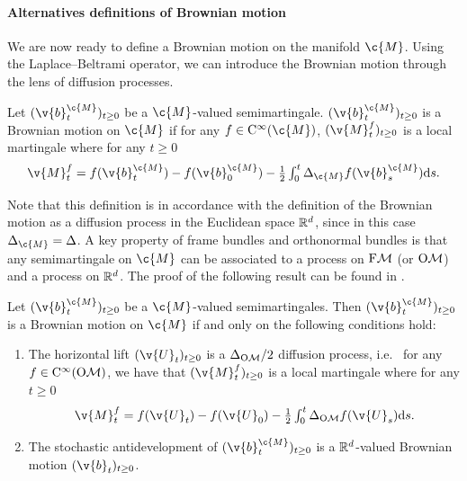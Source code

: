 \paragraph{Alternatives definitions of Brownian motion}

We are now ready to define a Brownian motion on the manifold $\c{M}$.
Using the Laplace--Beltrami operator, we can introduce the Brownian motion through the lens of diffusion processes.

\begin{definition}
	Let $(\v{b}_t^\c{M})_{t \geq 0}$ be a $\c{M}$-valued semimartingale.
	$(\v{b}_t^\c{M})_{t \geq 0}$ is a Brownian motion on $\c{M}$ if for any
	$f \in \mathrm{C}^\infty(\c{M})$, $(\v{M}_t^f)_{t \geq 0}$ is a local martingale where
	for any $t \geq 0$
	\begin{equation}
		\textstyle{\v{M}_t^f = f(\v{b}_t^\c{M}) - f(\v{b}_0^\c{M}) - \tfrac{1}{2}\int_0^t \Delta_{\c{M}}f(\v{b}_s^\c{M}) \mathrm{d} s  .}
	\end{equation}
\end{definition}

Note that this definition is in accordance with the definition of the Brownian motion as a diffusion process in the Euclidean space $\mathbb{R}^d$, since in this case $\Delta_{\c{M}} = \Delta$.
A key property of frame bundles and orthonormal bundles is that any semimartingale on $\c{M}$ can be associated to a process on $\mathrm{F}\mathcal{M}$ (or $\mathrm{O}\mathcal{M}$) and a process on $\mathbb{R}^d$.
The proof of the following result can be found in \textcite[Propositions 3.2.1 and 3.2.2]{hsu2002stochastic}.

\begin{proposition}
	\label{prop:intrinsic_brownian}
	Let $(\v{b}_t^\c{M})_{t \geq 0}$ be a $\c{M}$-valued semimartingales.
	Then $(\v{b}_t^\c{M})_{t \geq 0}$ is a Brownian motion on $\c{M}$ if and only on the following conditions hold: \begin{enumerate}[label=\alph*)] \item The horizontal lift $(\v{U}_t)_{t \geq 0}$ is a $\Delta_{\mathrm{O}\mathcal{M}}/2$ diffusion process, i.e. \ for any $f \in \mathrm{C}^\infty(\mathrm{O}\mathcal{M})$, we have that $(\v{M}_t^f)_{t \geq 0}$ is a local martingale where for any $t \geq 0$ \begin{equation} \textstyle{\v{M}_t^f = f(\v{U}_t) - f(\v{U}_0) - \tfrac{1}{2}\int_0^t \Delta_{\OM}f(\v{U}_s) \mathrm{d} s .
			      }
		      \end{equation}
		\item The stochastic antidevelopment of $(\v{b}_t^\c{M})_{t \geq 0}$ is a
		      $\mathbb{R}^d$-valued Brownian motion $(\v{b}_t)_{t \geq 0}$.
	\end{enumerate}
\end{proposition}

